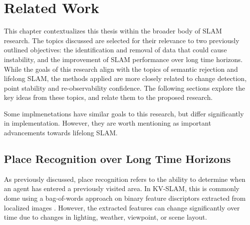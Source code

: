 \section{Related Work}
\label{sec:related_work}

This chapter contextualizes this thesis within the broader body of SLAM research. The topics discussed are selected for their relevance to two previously outlined objectives: the identification and removal of data that could cause instability, and the improvement of SLAM performance over long time horizons. While the goals of this research align with the topics of semantic rejection and lifelong SLAM, the methods applied are more closely related to change detection, point stability and re-observability confidence. The following sections explore the key ideas from these topics, and relate them to the proposed research.

Some implmenetations have similar goals to this research, but differ significantly in implementation. However, they are worth mentioning as important advancements towards lifelong SLAM.

\subsection{Place Recognition over Long Time Horizons}

As previously discussed, place recognition refers to the ability to determine when an agent has entered a previously visited area. In KV-SLAM, this is commonly dome using a bag-of-words approach on binary feature discriptors extracted from localized images \cite{camposORBSLAM3AccurateOpenSource2021}. However, the extracted features can change significantly over time due to changes in lighting, weather, viewpoint, or scene layout.

